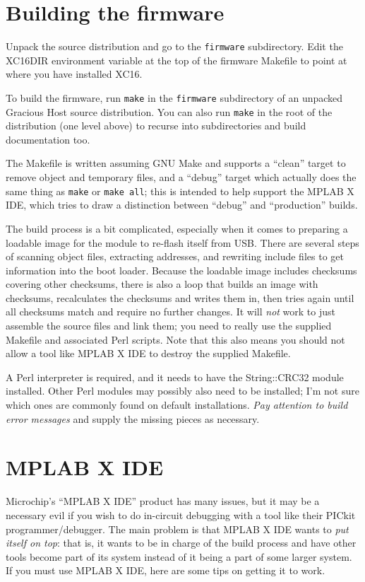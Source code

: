 \section{Building the firmware}

Unpack the source distribution and go to the \texttt{firmware} subdirectory.
Edit the XC16DIR environment variable at the top of the
firmware Makefile to point at where you have installed XC16.

To build the firmware, run \texttt{make} in the \texttt{firmware}
subdirectory of an unpacked Gracious Host source distribution.  You can also
run \texttt{make} in the root of the distribution (one level above) to
recurse into subdirectories and build documentation too.

The Makefile is written assuming GNU Make and supports a ``clean'' target to
remove object and temporary files, and a ``debug'' target which actually
does the same thing as \texttt{make} or \texttt{make all}; this is
intended to help support the MPLAB X IDE, which tries to draw a distinction
between ``debug'' and ``production'' builds.

The build process is a bit complicated, especially when it comes to
preparing a loadable image for the module to re-flash itself from USB. 
There are several steps of scanning object files, extracting addresses, and
rewriting include files to get information into the boot loader.  Because
the loadable image includes checksums covering other checksums, there is
also a loop that builds an image with checksums, recalculates the checksums
and writes them in, then tries again until all checksums match and require
no further changes.  It will \emph{not} work to just assemble the source
files and link them; you need to really use the supplied Makefile and
associated Perl scripts.  Note that this also means you should not allow a
tool like MPLAB X IDE to destroy the supplied Makefile.

A Perl interpreter is required, and it needs to have the String::CRC32
module installed.  Other Perl modules may possibly also need to be
installed; I'm not sure which ones are commonly found on default
installations.  \emph{Pay attention to build error messages} and supply the
missing pieces as necessary.

\section{MPLAB X IDE}

Microchip's ``MPLAB X IDE'' product has many issues, but it may be a
necessary evil if you wish to do in-circuit debugging with a tool like their
PICkit programmer/debugger.  The main problem is that MPLAB X IDE wants to
\emph{put itself on top}:  that is, it wants to be in charge of the build
process and have other tools become part of its system instead of it being a
part of some larger system.  If you must use MPLAB X IDE, here are some tips
on getting it to work.

